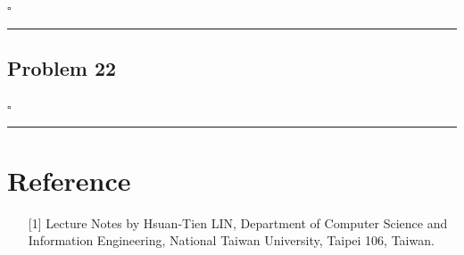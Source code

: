 \documentclass[12pt]{article}
\newcommand*{\QEDB}{\hfill\ensuremath{\square}}
\newcommand{\horrule}[1]{\rule{\linewidth}{#1}}
\begin{document}
\QEDB

\horrule{0.5pt}

\subsection*{Problem 22}

\QEDB

\horrule{0.5pt}

\section*{Reference}

\begin{enumerate}

\item[{[1]}] Lecture Notes by Hsuan-Tien LIN, Department of Computer Science and Information Engineering, National Taiwan University, Taipei 106, Taiwan.

\end{enumerate}
\end{document}
